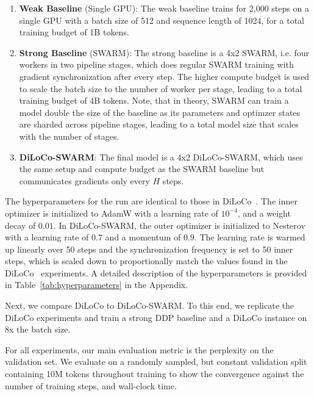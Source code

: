 \documentclass{article}
\begin{document}
\begin{enumerate}
  \item \textbf{Weak Baseline} (Single GPU): The weak baseline trains for 2,000
  steps on a single GPU with a batch size of 512 and sequence length of 1024,
  for a total training budget of 1B tokens. 
  \item \textbf{Strong Baseline} (SWARM): The strong baseline is a 4x2 SWARM,
  i.e. four workers in two pipeline stages, which does regular SWARM training
  with gradient synchronization after every step. The higher compute budget is
  used to scale the batch size to the number of worker per stage, leading to a
  total training budget of 4B tokens. Note, that in theory, SWARM can train a
  model double the size of the baseline as its parameters and optimzer states
  are sharded across pipeline stages, leading to a total model size that scales
  with the number of stages. 
  \item \textbf{DiLoCo-SWARM}: The final model is a 4x2 DiLoCo-SWARM, which uses
  the same setup and compute budget as the SWARM baseline but communicates
  gradients only every $H$ steps.
\end{enumerate}

The hyperparameters for the run are identical to those in
DiLoCo~\cite{douillard2023}. The inner optimizer is initialized to AdamW with a
learning rate of $10^{-4}$, and a weight decay of $0.01$. In DiLoCo-SWARM, the
outer optimizer is initialized to Nesterov with a learning rate of $0.7$ and a
momentum of $0.9$. The learning rate is warmed up linearly over 50 steps and the
synchronization frequency is set to 50 inner steps, which is scaled down to
proportionally match the values found in the DiLoCo~\cite{douillard2023}
experiments. A detailed description of the hyperparameters is provided in
Table~\ref{tab:hyperparameters} in the Appendix.

Next, we compare DiLoCo to DiLoCo-SWARM. To this end, we replicate the DiLoCo
experiments and train a strong DDP baseline and a DiLoCo instance on 8x the
batch size. 



For all experiments, our main evaluation metric is the perplexity on the
validation set. We evaluate on a randomly sampled, but constant validation split
containing 10M tokens throughout training to show the convergence against the
number of training steps, and wall-clock time.
\end{document}
